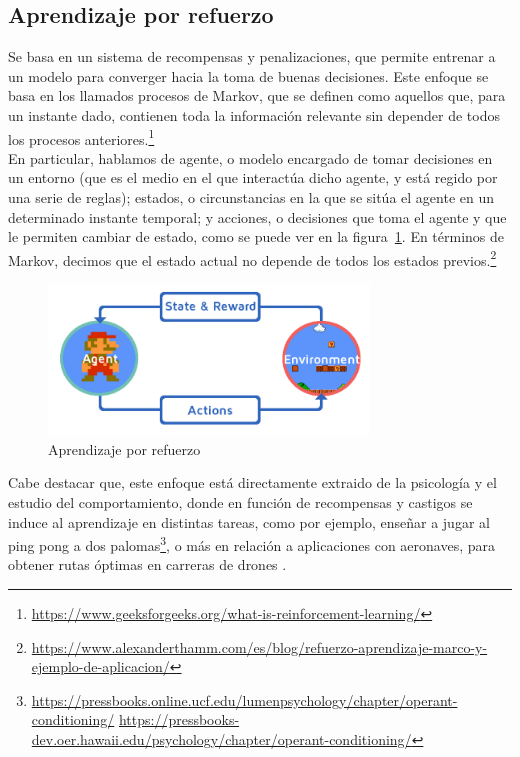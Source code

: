 \subsection{Aprendizaje por refuerzo}
\label{subsec:aprendizaje_por_refuerzo}

Se basa en un sistema de recompensas y penalizaciones, que permite entrenar a un modelo para converger hacia la toma de buenas decisiones. Este enfoque se basa en los llamados procesos de Markov, que se definen como aquellos que, para un instante dado, contienen toda la información relevante sin depender de todos los procesos anteriores.\footnote[18]{\url{https://www.geeksforgeeks.org/what-is-reinforcement-learning/}}\\

En particular, hablamos de agente, o modelo encargado de tomar decisiones en un entorno (que es el medio en el que interactúa dicho agente, y está regido por una serie de reglas); estados, o circunstancias en la que se sitúa el agente en un determinado instante temporal; y acciones, o decisiones que toma el agente y que le permiten cambiar de estado, como se puede ver en la figura~\ref{fig:reinforcement_learning}. En términos de Markov, decimos que el estado actual no depende de todos los estados previos.\footnote[19]{\url{https://www.alexanderthamm.com/es/blog/refuerzo-aprendizaje-marco-y-ejemplo-de-aplicacion/}}\\

\begin{figure} [tp]
	\begin{center}
	\includegraphics[height=4cm]{imagenes/cap1/9_reinforcement.png}
	\end{center}
	\caption[Aprendizaje por refuerzo]{Aprendizaje por refuerzo}
	\label{fig:reinforcement_learning}
\end{figure}

Cabe destacar que, este enfoque está directamente extraido de la psicología y el estudio del comportamiento, donde en función de recompensas y castigos se induce al aprendizaje en distintas tareas, como por ejemplo, enseñar a jugar al ping pong a dos palomas\footnote[20]{\url{https://pressbooks.online.ucf.edu/lumenpsychology/chapter/operant-conditioning/} \url{https://pressbooks-dev.oer.hawaii.edu/psychology/chapter/operant-conditioning/}}, o más en relación a aplicaciones con aeronaves, para obtener rutas óptimas en carreras de drones \cite{9636053}.\\

